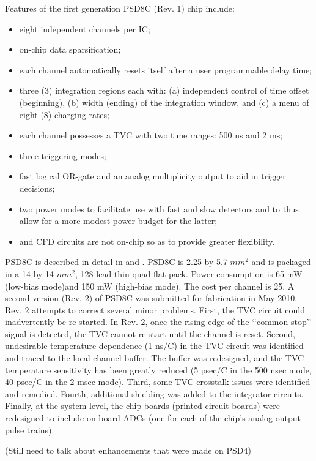 \documentclass[12pt,oneside,final]{siuethesis}
\theoremstyle{definition}
\begin{document}
Features of the first generation PSD8C (Rev. 1) chip include:
\begin{itemize}
\item
eight independent channels per IC;
\item
on-chip data sparsification;
\item
each channel automatically resets itself after a user programmable delay time;
\item
three (3) integration regions each with: (a) independent
control of time offset (beginning), (b) width (ending) of the
integration window, and (c) a menu of eight (8) charging rates;
\item
each channel possesses a TVC with two time ranges: 500 ns and 2 ms;
\item
three triggering modes;
\item
fast logical OR-gate and an analog multiplicity output to aid in
trigger decisions;
\item
two power modes to facilitate use with fast and slow detectors
and to thus allow for a more modest power budget for the
latter; 
\item
and CFD circuits are not on-chip so as to provide greater flexibility.
\end{itemize}

PSD8C is described in detail in \cite{PROCTOR} and \cite{HALL}. PSD8C is 2.25 by 5.7 $mm^2$ and is packaged in a 14 by 14 $mm^2$, 128 lead thin quad flat pack. Power consumption is 65 mW (low-bias mode)and 150 mW (high-bias mode). The cost per channel is 25.
A second version (Rev. 2) of PSD8C was submitted for fabrication in May 2010. Rev. 2 attempts to correct several minor
problems. First, the TVC circuit could inadvertently be re-started. In Rev. 2, once the rising edge of the ‘‘common stop’’ signal is detected, the TVC cannot re-start until the channel is reset. Second, undesirable temperature dependence (1 ns/C) in the TVC circuit was identified and traced to the local channel buffer. The buffer was redesigned, and the TVC temperature sensitivity has been greatly reduced (5 psec/C in the 500 nsec mode, 40 psec/C in the 2 msec mode). Third, some TVC crosstalk issues were identified and remedied. Fourth, additional shielding was added to the integrator circuits. Finally, at the system level, the chip-boards (printed-circuit boards) were redesigned to include on-board ADCs (one for each of the chip's analog output pulse trains).

(Still need to talk about enhancements that were made on PSD4)
\end{document}
